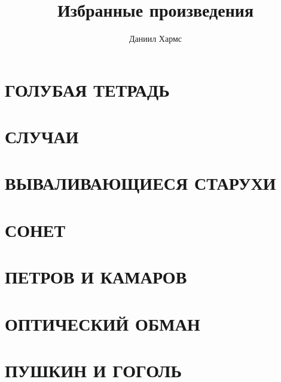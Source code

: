 \documentclass{book}
\begin{document}
\author{Даниил Хармс}
\title{Избранные произведения}
\date{}
\maketitle
\chapter{ГОЛУБАЯ ТЕТРАДЬ}

\chapter{СЛУЧАИ}
                 
\chapter{ВЫВАЛИВАЮЩИЕСЯ СТАРУХИ}
   
\chapter{СОНЕТ}
   
\chapter{ПЕТРОВ И КАМАРОВ}
   
\chapter{ОПТИЧЕСКИЙ ОБМАН}
  
\chapter{ПУШКИН И ГОГОЛЬ}
  
\end{document}
